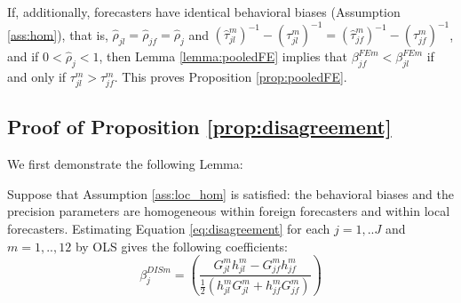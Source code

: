 If, additionally, forecasters have identical behavioral biases (Assumption \ref{ass:hom}), that is, $\hat\rho_{jl}=\hat\rho_{jf}=\hat\rho_j$ and $(\hat\tau_{jl}^m)^{-1}-(\tau_{jl}^m)^{-1}=(\hat\tau_{jf}^m)^{-1}-(\tau_{jf}^m)^{-1}$, and if $0<\hat\rho_j<1$, then Lemma \ref{lemma:pooledFE} implies that $\beta^{FEm}_{jf}<\beta^{FEm}_{jl}$ if and only if $\tau_{jl}^m>\tau_{jf}^m$. This proves Proposition \ref{prop:pooledFE}.



\subsection{Proof of Proposition \ref{prop:disagreement}}
\label{proof:disagreement}

We first demonstrate the following Lemma:
\begin{lemma}\label{lemma:disagreement} Suppose that Assumption \ref{ass:loc_hom} is satisfied: the behavioral biases and  the precision parameters are homogeneous within foreign forecasters and within local forecasters. Estimating Equation \eqref{eq:disagreement} for each $j=1,..J$ and $m=1,..,12$ by OLS gives the following coefficients:
$$\beta^{DISm}_{j}=\left(\frac{G_{jl}^mh_{jl}^m-G_{jf}^mh_{jf}^m}{\frac{1}{2}(h_{jl}^mG_{jl}^m+h_{jf}^mG_{jf}^m)}\right)$$
\end{lemma}

